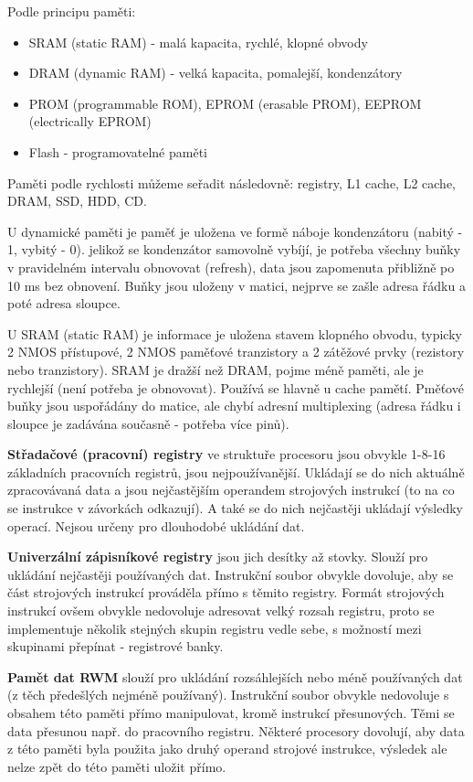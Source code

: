 Podle principu paměti:
\begin{itemize}
\item SRAM (static RAM) - malá kapacita, rychlé, klopné obvody
\item DRAM (dynamic RAM) - velká kapacita, pomalejší, kondenzátory
\item PROM (programmable ROM), EPROM (erasable PROM), EEPROM (electrically EPROM)
\item Flash - programovatelné paměti
\end{itemize}

Paměti podle rychlosti můžeme seřadit následovně: registry, L1 cache, L2 cache, DRAM, SSD, HDD, CD.

U dynamické paměti je paměť je uložena ve formě náboje kondenzátoru (nabitý - 1, vybitý - 0). jelikož se kondenzátor samovolně vybíjí, je potřeba všechny buňky v pravidelném intervalu obnovovat (refresh), data jsou zapomenuta přibližně po 10 ms bez obnovení. Buňky jsou uloženy v matici, nejprve se zašle adresa řádku a poté adresa sloupce.

U SRAM (static RAM) je informace je uložena stavem klopného obvodu, typicky 2 NMOS přístupové, 2 NMOS paměťové tranzistory a 2 zátěžové prvky (rezistory nebo tranzistory). SRAM je dražší než DRAM, pojme méně paměti, ale je rychlejší (není potřeba je obnovovat). Používá se hlavně u cache pamětí. Pměťové buňky jsou uspořádány do matice, ale chybí adresní multiplexing (adresa řádku i sloupce je zadávána současně - potřeba více pinů).



\textbf{Střadačové (pracovní) registry}  ve struktuře procesoru jsou obvykle 1-8-16 základních pracovních registrů, jsou nejpoužívanější. Ukládají se do nich aktuálně zpracovávaná data a jsou nejčastějším operandem strojových instrukcí (to na co se instrukce v závorkách odkazují). A také se do nich nejčastěji ukládají výsledky operací. Nejsou určeny pro dlouhodobé ukládání dat.


\textbf{Univerzální zápisníkové registry} jsou jich desítky až stovky. Slouží pro ukládání nejčastěji používaných dat. Instrukční soubor obvykle dovoluje, aby se část strojových instrukcí prováděla přímo s těmito registry. Formát strojových instrukcí ovšem obvykle nedovoluje adresovat velký rozsah registru, proto se implementuje několik stejných skupin registru vedle sebe, s možností mezi skupinami přepínat - registrové banky.


\textbf{Pamět dat RWM} slouží pro ukládání rozsáhlejších nebo méně používaných dat (z těch předešlých nejméně používaný). Instrukční soubor obvykle nedovoluje s obsahem této paměti přímo manipulovat, kromě instrukcí přesunových. Těmi se data přesunou např. do pracovního registru. Některé procesory dovolují, aby data z této paměti byla použita jako druhý operand strojové instrukce, výsledek ale nelze zpět do této paměti uložit přímo.


